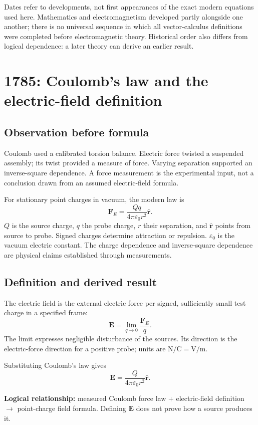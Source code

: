 \documentclass[11pt,letterpaper]{article}
\newcommand{\vect}[1]{\boldsymbol{#1}}
\newcommand{\idea}[1]{\par\smallskip\noindent\colorbox{pale}{\parbox{\dimexpr\linewidth-2\fboxsep\relax}{#1}}\par\smallskip}
\begin{document}
Dates refer to developments, not first appearances of the exact modern equations used here. Mathematics and electromagnetism developed partly alongside one another; there is no universal sequence in which all vector-calculus definitions were completed before electromagnetic theory. Historical order also differs from logical dependence: a later theory can derive an earlier result.

\newpage
\section{1785: Coulomb's law and the electric-field definition}
\subsection*{Observation before formula}
Coulomb used a calibrated torsion balance. Electric force twisted a suspended assembly; its twist provided a measure of force. Varying separation supported an inverse-square dependence. A force measurement is the experimental input, not a conclusion drawn from an assumed electric-field formula.\cite{coulomb}

For stationary point charges in vacuum, the modern law is
\begin{equation}
\vect F_E=\frac{Qq}{4\pi\varepsilon_0r^2}\hat{\vect r}.
\end{equation}
$Q$ is the source charge, $q$ the probe charge, $r$ their separation, and $\hat{\vect r}$ points from source to probe. Signed charges determine attraction or repulsion. $\varepsilon_0$ is the vacuum electric constant. The charge dependence and inverse-square dependence are physical claims established through measurements.

\subsection*{Definition and derived result}
The electric field is the external electric force per signed, sufficiently small test charge in a specified frame:
\begin{equation}
\vect E=\lim_{q\to0}\frac{\vect F_E}{q}.
\end{equation}
The limit expresses negligible disturbance of the sources. Its direction is the electric-force direction for a positive probe; units are $\mathrm{N/C}=\mathrm{V/m}$.

Substituting Coulomb's law gives
\begin{equation}
\vect E=\frac{Q}{4\pi\varepsilon_0r^2}\hat{\vect r}.
\end{equation}
\idea{\textbf{Logical relationship:} measured Coulomb force law + electric-field definition $\longrightarrow$ point-charge field formula. Defining $\vect E$ does not prove how a source produces it.}
\end{document}
